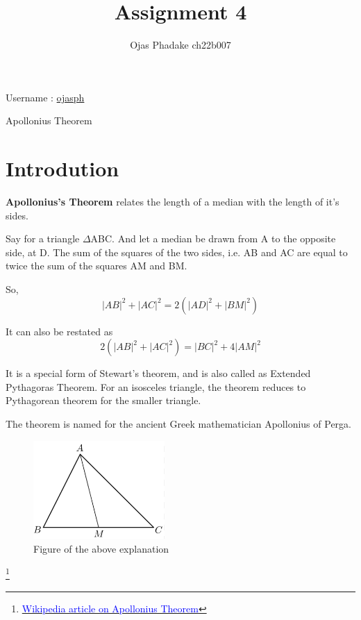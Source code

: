 \documentclass{article}
\title{Assignment 4}
\author{Ojas Phadake ch22b007}
\begin{document}
\maketitle
\begin{center}
{Username : \href{https://github.com/ojasph}{ojasph} }
\end{center}
{\Huge\begin{center}
    Apollonius Theorem
      \end{center}} 

\section{Introdution}
\textbf{Apollonius's Theorem} relates the length of  a median with the length of it's sides. 

Say for a triangle $\Delta$ABC. And let a median be drawn from A to the opposite side, at D. The sum of the squares of the two sides, i.e. AB and AC are equal to twice the sum of the squares AM and BM. 

So, 
\begin{equation}
    |AB|^2 + |AC|^2 = 2(|AD|^2 + |BM|^2)
\end{equation}

It can also be restated as 
\begin{equation}
    2(|AB|^2 + |AC|^2) = |BC|^2 + 4|AM|^2
\end{equation}

It is a special form of Stewart's theorem, and is also called as Extended Pythagoras Theorem. For an isosceles triangle, the theorem reduces to Pythagorean theorem for the smaller triangle. 

The theorem is named for the ancient Greek mathematician Apollonius of Perga.

\begin{figure}[H]
    \centering
    \includegraphics[width = 5cm]{Screenshot 2023-06-13 235751.png}
    \caption{Figure of the above explanation}
\end{figure}

\footnote
{\href{https://en.wikipedia.org/wiki/Apollonius\%27s\_theorem}{\textcolor{blue}{Wikipedia article on Apollonius Theorem}}}
\end{document}
